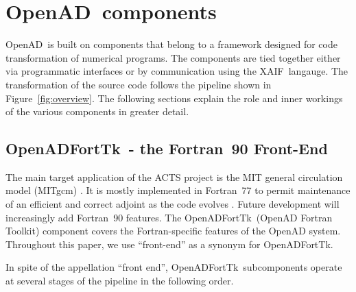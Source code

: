 \documentclass[acmtocl,acmnow]{acmtrans2m}
\newcommand{\OpenAD}{OpenAD}
\newcommand{\OpenADFortTk}{OpenADFortTk}
\newcommand{\xaif}{XAIF}
\newcommand{\reffig}[1]{Figure~\ref{#1}}
\begin{document}
\section{\OpenAD\ components}

\OpenAD\ is built on components that belong to a framework designed
for code transformation of numerical programs.  The components are
tied together either via programmatic interfaces or by communication
using the \xaif\ langauge. The transformation of the source code follows the
pipeline shown in \reffig{fig:overview}.  The following sections
explain the role and inner workings of the various components in
greater detail.

\subsection{\OpenADFortTk\ - the Fortran~90 Front-End}

The main target application of the ACTS project is the MIT general
circulation model (MITgcm) \cite{mars-eta:97b,mars-eta:97a}.
It is mostly implemented in Fortran~77 to permit maintenance of an
efficient and correct adjoint as the code evolves \cite{HHG02}. Future
development will increasingly add Fortran~90 features.  The
\OpenADFortTk\ (OpenAD Fortran Toolkit) 
component covers the
Fortran-specific features of the OpenAD system. Throughout this
paper, we use ``front-end'' as a synonym for \OpenADFortTk.

In spite of the appellation ``front end'', \OpenADFortTk\ subcomponents
operate at several stages of the pipeline in the following order.
	
\end{document}
